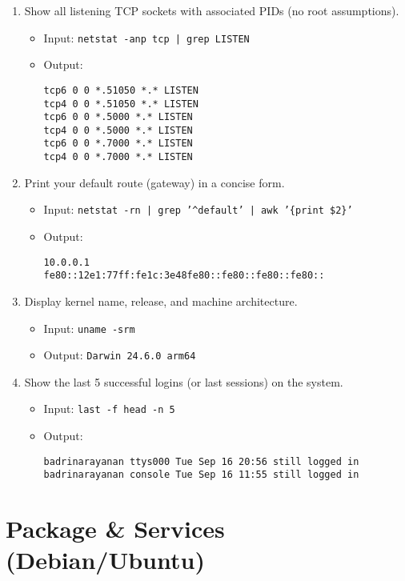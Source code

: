 \begin{enumerate}
\item Show all listening TCP sockets with associated PIDs (no root assumptions).
\begin{itemize}
\item Input: \texttt{netstat -anp tcp | grep LISTEN}
\item Output:
\begin{verbatim}
tcp6 0 0 *.51050 *.* LISTEN
tcp4 0 0 *.51050 *.* LISTEN
tcp6 0 0 *.5000 *.* LISTEN
tcp4 0 0 *.5000 *.* LISTEN
tcp6 0 0 *.7000 *.* LISTEN
tcp4 0 0 *.7000 *.* LISTEN
\end{verbatim}
\end{itemize}

\item Print your default route (gateway) in a concise form.
\begin{itemize}
\item Input: \texttt{netstat -rn | grep '\^{}default' | awk '\{print \$2\}'}
\item Output:
\begin{verbatim}
10.0.0.1
fe80::12e1:77ff:fe1c:3e48fe80::fe80::fe80::fe80::
\end{verbatim}
\end{itemize}

\item Display kernel name, release, and machine architecture.
\begin{itemize}
\item Input: \texttt{uname -srm}
\item Output: \texttt{Darwin 24.6.0 arm64}
\end{itemize}

\item Show the last 5 successful logins (or last sessions) on the system.
\begin{itemize}
\item Input: \texttt{last -f head -n 5}
\item Output:
\begin{verbatim}
badrinarayanan ttys000 Tue Sep 16 20:56 still logged in
badrinarayanan console Tue Sep 16 11:55 still logged in
\end{verbatim}
\end{itemize}
\end{enumerate}

\section{Package \& Services (Debian/Ubuntu)}

